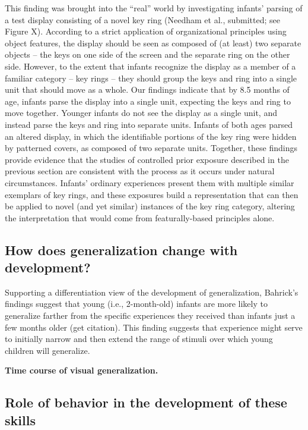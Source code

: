 This finding was brought into the ``real'' world by investigating
infants' parsing of a test display consisting of a novel key
ring (Needham et al., submitted; see Figure X).  According to a strict
application of organizational principles using object features, the
display should be seen as composed of (at least) two separate
objects -- the keys on one side of the screen and the separate
ring on the other side.  However, to the extent that infants recognize
the display as a member of a familiar category -- key
rings -- they should group the keys and ring into a single unit
that should move as a whole.  Our findings indicate that by 8.5 months
of age, infants parse the display into a single unit, expecting the
keys and ring to move together.  Younger infants do not see the
display as a single unit, and instead parse the keys and ring into
separate units.  Infants of both ages parsed an altered display, in
which the identifiable portions of the key ring were hidden by
patterned covers, as composed of two separate units.  Together, these
findings provide evidence that the studies of controlled prior
exposure described in the previous section are consistent with the
process as it occurs under natural circumstances.  Infants'
ordinary experiences present them with multiple similar exemplars of
key rings, and these exposures build a representation that can then be
applied to novel (and yet similar) instances of the key ring category,
altering the interpretation that would come from featurally-based
principles alone.



\subsection{How does generalization change with development?}

Supporting a differentiation view of the development of
generalization, Bahrick's findings suggest that young (i.e.,
2-month-old) infants are more likely to generalize farther from the
specific experiences they received than infants just a few months
older (get citation).  This finding suggests that experience might
serve to initially narrow and then extend the range of stimuli over
which young children will generalize.

{
\bf Time course of visual generalization.
}

\subsection{Role of behavior in the development of these skills}

